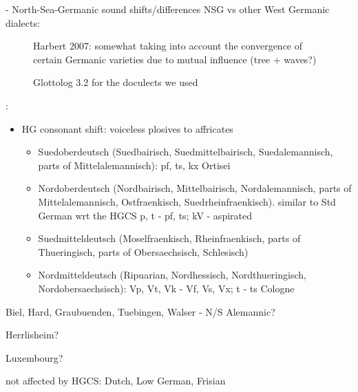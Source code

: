 \documentclass{article}
\begin{document}
- North-Sea-Germanic sound shifts/differences NSG vs other West Germanic dialects: \citet{stiles2013pan-west}

\begin{figure}
\centering

\caption{Harbert 2007: somewhat taking into account the convergence of certain Germanic varieties due to mutual influence (tree + waves?)}
\label{fig:cwg_harbert}
\end{figure}


\begin{figure}
\begin{adjustwidth}{-3cm}{-3cm}
\centering
\scalebox{0.8}{

}
\end{adjustwidth}
% 
\caption{Glottolog 3.2 for the doculects we used}
\end{figure}

\citet[pp. 182-199]{goblirsch2005lautverschiebungen}:

\begin{itemize}
  \item HG consonant shift: voiceless plosives to affricates 
  \begin{itemize}
    \item Suedoberdeutsch (Suedbairisch, Suedmittelbairisch, Suedalemannisch, parts of Mittelalemannisch): pf, ts, kx
    Ortisei
    \item Nordoberdeutsch (Nordbairisch, Mittelbairisch, Nordalemannisch, parts of Mittelalemannisch, Ostfraenkisch, Suedrheinfraenkisch).
    similar to Std German wrt the HGCS
    p, t - pf, ts; kV - aspirated
    \item Suedmitteldeutsch (Moselfraenkisch, Rheinfraenkisch, parts of Thueringisch, parts of Obersaechsisch, Schlesisch)
    \item Nordmitteldeutsch (Ripuarian, Nordhessisch, Nordthueringisch, Nordobersaechsisch):
    Vp, Vt, Vk - Vf, Vs, Vx; t - ts
    Cologne
  \end{itemize}
\end{itemize}

Biel, Hard, Graubuenden, Tuebingen, Walser - N/S Alemannic?

Herrlisheim?

Luxembourg?

not affected by HGCS: Dutch, Low German, Frisian
\end{document}
